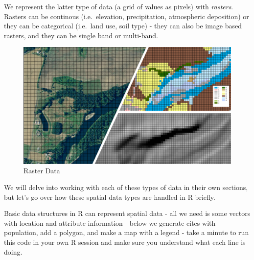 \documentclass[
]{book}
\begin{document}
We represent the latter type of data (a grid of values as pixels) with \emph{rasters}. Rasters can be continous (i.e.~elevation, precipitation, atmospheric deposition) or they can be categorical (i.e.~land use, soil type) - they can also be image based rasters, and they can be single band or multi-band.

\begin{figure}
\includegraphics[width=1\linewidth]{images/Rasters4} \caption{Raster Data}\label{fig:unnamed-chunk-17}
\end{figure}

We will delve into working with each of these types of data in their own sections, but let's go over how these spatial data types are handled in R briefly.

Basic data structures in R can represent spatial data - all we need is some vectors with location and attribute information - below we generate cites with population, add a polygon, and make a map with a legend - take a minute to run this code in your own R session and make sure you understand what each line is doing.
\end{document}
